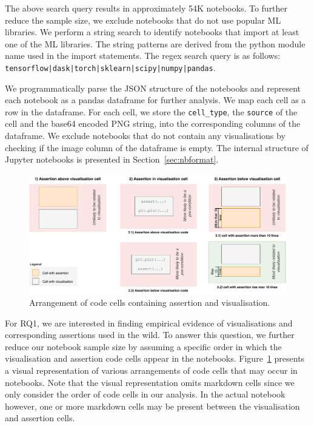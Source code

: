 \documentclass[conference]{IEEEtran}
\begin{document}
The above search query results in approximately 54K notebooks. To
further reduce the sample size, we exclude notebooks that do not use
popular ML libraries. We perform a string search to identify notebooks
that import at least one of the ML libraries. The string patterns are
derived from the python module name used in the import statements. The
regex search query is as follows:
\texttt{tensorflow|dask|torch|sklearn|scipy|numpy|pandas}.

We programmatically parse the JSON structure of the notebooks and
represent each notebook as a pandas dataframe for further analysis. We
map each cell as a row in the dataframe. For each cell, we store the
\texttt{cell\_type}, the \texttt{source} of the cell and the base64
encoded PNG string, into the corresponding columns of the
dataframe. We exclude notebooks that do not contain any visualisations
by checking if the image column of the dataframe is empty. The
internal structure of Jupyter notebooks is presented in
Section~\ref{sec:nbformat}.

\begin{figure}
  \centering
  \includegraphics[width=\textwidth]{nb-structure.pdf}
  \caption{Arrangement of code cells containing assertion and
    visualisation.}
  \label{fig:cell-arrangement}
\end{figure}

For RQ1, we are interested in finding empirical evidence of
visualisations and corresponding assertions used in the wild. To
answer this question, we further reduce our notebook sample size by
assuming a specific order in which the visualisation and assertion
code cells appear in the notebooks. Figure~\ref{fig:cell-arrangement}
presents a visual representation of various arrangements of code cells
that may occur in notebooks. Note that the visual representation omits
markdown cells since we only consider the order of code cells in our
analysis. In the actual notebook however, one or more markdown cells
may be present between the visualisation and assertion cells.
\end{document}
